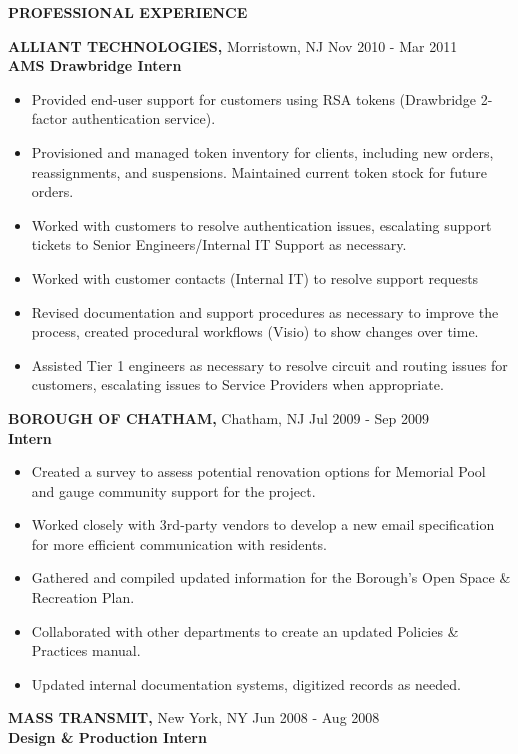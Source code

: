\documentclass[]{article}
\providecommand{\tightlist}{%
  \setlength{\itemsep}{0pt}\setlength{\parskip}{0pt}}
\begin{document}
\textbf{PROFESSIONAL EXPERIENCE}

{\textbf{ALLIANT TECHNOLOGIES,} Morristown, NJ}{ Nov 2010 - Mar 2011}\\
\textbf{AMS Drawbridge Intern}

\begin{itemize}
\tightlist
\item
  Provided end-user support for customers using RSA tokens (Drawbridge
  2-factor authentication service).
\item
  Provisioned and managed token inventory for clients, including new
  orders, reassignments, and suspensions. Maintained current token stock
  for future orders.
\item
  Worked with customers to resolve authentication issues, escalating
  support tickets to Senior Engineers/Internal IT Support as necessary.
\item
  Worked with customer contacts (Internal IT) to resolve support
  requests
\item
  Revised documentation and support procedures as necessary to improve
  the process, created procedural workflows (Visio) to show changes over
  time.
\item
  Assisted Tier 1 engineers as necessary to resolve circuit and routing
  issues for customers, escalating issues to Service Providers when
  appropriate.
\end{itemize}

{\textbf{BOROUGH OF CHATHAM,} Chatham, NJ}{ Jul 2009 - Sep 2009}\\
\textbf{Intern}

\begin{itemize}
\tightlist
\item
  Created a survey to assess potential renovation options for Memorial
  Pool and gauge community support for the project.
\item
  Worked closely with 3rd-party vendors to develop a new email
  specification for more efficient communication with residents.
\item
  Gathered and compiled updated information for the Borough's Open Space
  \& Recreation Plan.
\item
  Collaborated with other departments to create an updated Policies \&
  Practices manual.
\item
  Updated internal documentation systems, digitized records as needed.
\end{itemize}

{\textbf{MASS TRANSMIT,} New York, NY}{ Jun 2008 - Aug 2008}\\
\textbf{Design \& Production Intern}
\end{document}
